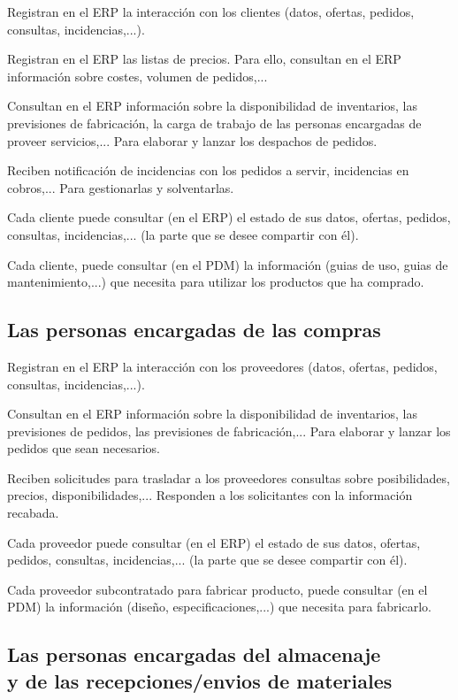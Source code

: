 \documentclass[spanish,12pt,a4paper,final,oneside]{book}
\begin{document}
Registran en el ERP la interacción con los clientes (datos, ofertas, pedidos, consultas, incidencias,...). 

Registran en el ERP las listas de precios. Para ello, consultan en el ERP información sobre costes, volumen de pedidos,...

Consultan en el ERP información sobre la disponibilidad de inventarios, las previsiones de fabricación, la carga de trabajo de las personas encargadas de proveer servicios,... Para elaborar y lanzar los despachos de pedidos. 

Reciben notificación de incidencias con los pedidos a servir, incidencias en cobros,... Para gestionarlas y solventarlas.

Cada cliente puede consultar (en el ERP) el estado de sus datos, ofertas, pedidos, consultas, incidencias,... (la parte que se desee compartir con él).

Cada cliente, puede consultar (en el PDM) la información (guias de uso, guias de mantenimiento,...) que necesita para utilizar los productos que ha comprado.

\subsection{Las personas encargadas de las compras}

Registran en el ERP la interacción con los proveedores (datos, ofertas, pedidos, consultas, incidencias,...). 

Consultan en el ERP información sobre la disponibilidad de inventarios, las previsiones de pedidos, las previsiones de fabricación,... Para elaborar y lanzar los pedidos que sean necesarios.

Reciben solicitudes para trasladar a los proveedores consultas sobre posibilidades, precios, disponibilidades,... Responden a los solicitantes con la información recabada.

Cada proveedor puede consultar (en el ERP) el estado de sus datos, ofertas, pedidos, consultas, incidencias,... (la parte que se desee compartir con él).

Cada proveedor subcontratado para fabricar producto, puede consultar (en el PDM) la información (diseño, especificaciones,...) que necesita para fabricarlo.

\subsection{Las personas encargadas del almacenaje\\y de las recepciones/envios de materiales}
\end{document}
